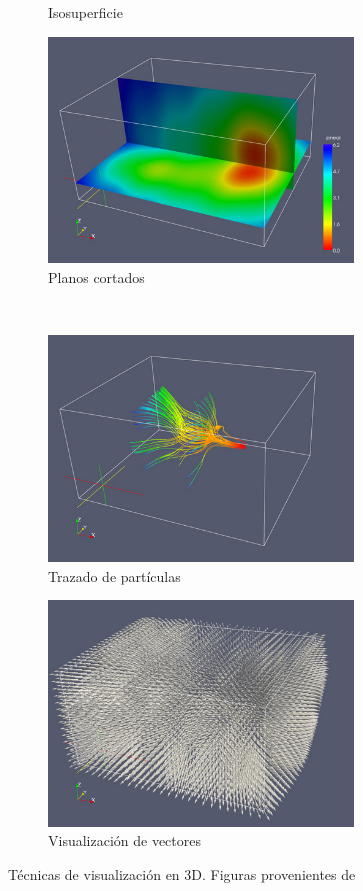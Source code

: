 \begin{figure}[t]
\begin{subfigure}[b]{.45\textwidth}
			\caption{Isosuperficie}
			\label{fig:isosurface}
	\end{subfigure} \hfill
	\begin{subfigure}[b]{.45\textwidth}
			\includegraphics[height=6cm,width=\textwidth]{figures/sliceplanes.jpg}
			\caption{Planos cortados}
			\label{fig:sliceplanes}
	\end{subfigure}
	\newline\\
	\begin{subfigure}[b]{.45\textwidth}
			\includegraphics[height=6cm,width=\textwidth]{figures/particletracing.jpg}
			\caption{Trazado de partículas}
			\label{fig:particletracing}
	\end{subfigure} \hfill
	\begin{subfigure}[b]{.45\textwidth}
			\includegraphics[height=6cm,width=\textwidth]{figures/vectorvisualization.jpg}
			\caption{Visualización de vectores}
			\label{fig:vectorvisualization}
	\end{subfigure}
	\caption{Técnicas de visualización en 3D. Figuras provenientes
	de~\cite{3dimages}}
	\label{fig:3dvis}
\end{figure}

